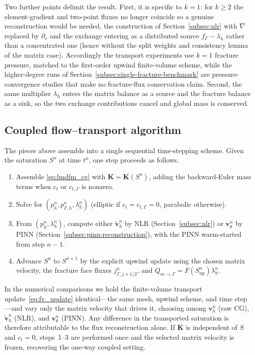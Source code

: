 \documentclass[a4paper,fleqn]{cas-sc}
\newcommand{\Kmat}{\mathbf{K}}
\newcommand{\vflux}{\mathbf{v}}
\begin{document}
{Two further points delimit the result. First, it is specific to \(k=1\): for
\(k\ge2\) the element-gradient and two-point fluxes no longer coincide so a genuine reconstruction would be
needed, the construction of Section~\ref{subsec:nlr} with \(\nabla\) replaced by
\(\partial_s\) and the exchange entering as a distributed source
\(f_\Gamma-\lambda_h\) rather than a concentrated one (hence without the split
weights and consistency lemma of the matrix case). Accordingly the transport
experiments use \(k=1\) fracture pressure, matched to the first-order upwind
finite-volume scheme, while the higher-degree runs of
Section~\ref{subsec:single-fracture-benchmark} are pressure-convergence studies that
make no fracture-flux conservation claim. Second, the same multiplier \(\lambda_h\)
enters the matrix balance as a source and the fracture balance as a sink, so the two
exchange contributions cancel and global mass is conserved.
}

\subsection{Coupled flow--transport algorithm}
\label{subsec:method-coupling}

The pieces above assemble into a single sequential time-stepping scheme. Given
the saturation \(S^n\) at time \(t^n\), one step proceeds as follows.
\begin{enumerate}
\item Assemble \eqref{eq:lmdfm_cg} with \(\Kmat=\Kmat(S^n)\), adding the
backward-Euler mass terms when \(c_t\) or \(c_{t,\Gamma}\) is nonzero.
\item Solve for \((p_h^n,p_{\Gamma,h}^n,\lambda_h^n)\) (elliptic if
\(c_t=c_{t,\Gamma}=0\), parabolic otherwise).
\item From \((p_h^n,\lambda_h^n)\), compute either
\(\widetilde{\vflux}_h^n\) by NLR (Section~\ref{subsec:nlr}) or
\(\vflux_\theta^n\) by PINN (Section~\ref{subsec:pinn-reconstruction}), with
the PINN warm-started from step \(n-1\).
\item Advance \(S^n\) to \(S^{n+1}\) by the explicit upwind update using the
chosen matrix velocity, the fracture face fluxes \(j_{\Gamma,j+1/2}^n\), and
\(Q_{m\to\Gamma}=F(S^n_{\mathrm{up}})\lambda_h^n\).
\end{enumerate}
In the numerical comparisons we hold the finite-volume transport
update~\eqref{eq:fv_update} identical---the same mesh, upwind scheme, and time
step---and vary only the matrix velocity that drives it, choosing among \(\vflux_h^n\) (raw CG),
\(\widetilde{\vflux}_h^n\) (NLR), and \(\vflux_\theta^n\) (PINN). Any difference in
the transported saturation is therefore attributable to the flux reconstruction
alone. If \(\Kmat\) is independent of \(S\) and \(c_t=0\),
steps~1--3 are performed once and the selected matrix velocity is frozen,
recovering the one-way coupled setting.
\end{document}

